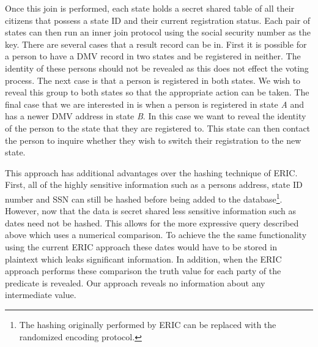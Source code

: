 Once this join is performed, each state holds a secret shared table of all their citizens that possess a state ID and their current registration status. Each pair of states can then run an inner join protocol using the social security number as the key. There are several cases that a result record can be in. First it is possible for a person to have a DMV record in two states and be registered in neither. The identity of these persons should not be revealed as this does not effect the voting process. The next case is that a person is registered in both states. We wish to reveal this group to both states so that the appropriate action can be taken. The final case that we are interested in is when a person is registered in state \emph{A} and has a newer DMV address in state \emph{B}. In this case we want to reveal the identity of the person to the state that they are registered to. This state can then contact the person to inquire whether they wish to switch their registration to the new state. 


This approach has additional advantages over the hashing technique of ERIC. First, all of the highly sensitive information such as a persons address, state ID number and SSN can still be hashed before being added to the database\footnote{The hashing originally performed by ERIC can be replaced with the randomized encoding protocol.}. However, now that the data is secret shared less sensitive information such as dates need not be hashed. This allows for the more expressive query described above which uses a numerical comparison. To achieve the the same functionality using the current ERIC approach these dates would have to be stored in plaintext which leaks significant information. In addition, when the ERIC approach performs these comparison the truth value for each party of the predicate is revealed. Our approach reveals no information about any intermediate value. 


